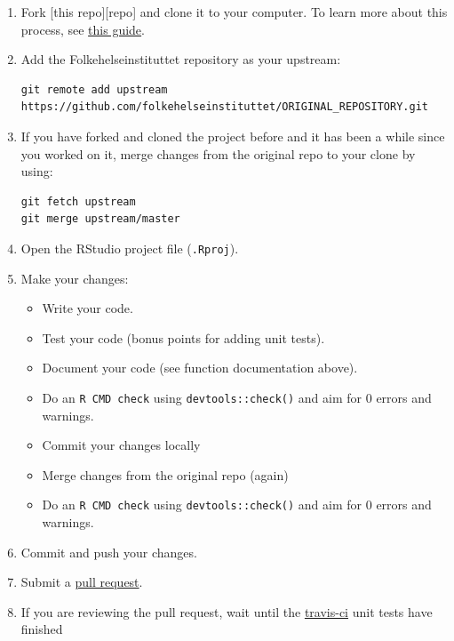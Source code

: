 \documentclass[12pt,]{article}
\providecommand{\tightlist}{%
  \setlength{\itemsep}{0pt}\setlength{\parskip}{0pt}}
\theoremstyle{definition}
\theoremstyle{definition}
\theoremstyle{definition}
\theoremstyle{remark}
\begin{document}
\begin{enumerate}
\def\labelenumi{\arabic{enumi}.}
\item
  Fork {[}this repo{]}{[}repo{]} and clone it to your computer. To learn
  more about this process, see
  \href{https://guides.github.com/activities/forking/}{this guide}.
\item
  Add the Folkehelseinstituttet repository as your upstream:

\begin{verbatim}
git remote add upstream https://github.com/folkehelseinstituttet/ORIGINAL_REPOSITORY.git
\end{verbatim}
\item
  If you have forked and cloned the project before and it has been a
  while since you worked on it, merge changes from the original repo to
  your clone by using:

\begin{verbatim}
git fetch upstream
git merge upstream/master
\end{verbatim}
\item
  Open the RStudio project file (\texttt{.Rproj}).
\item
  Make your changes:

  \begin{itemize}
  \tightlist
  \item
    Write your code.
  \item
    Test your code (bonus points for adding unit tests).
  \item
    Document your code (see function documentation above).
  \item
    Do an \texttt{R\ CMD\ check} using \texttt{devtools::check()} and
    aim for 0 errors and warnings.
  \item
    Commit your changes locally
  \item
    Merge changes from the original repo (again)
  \item
    Do an \texttt{R\ CMD\ check} using \texttt{devtools::check()} and
    aim for 0 errors and warnings.
  \end{itemize}
\item
  Commit and push your changes.
\item
  Submit a
  \href{https://guides.github.com/activities/forking/\#making-a-pull-request}{pull
  request}.
\item
  If you are reviewing the pull request, wait until the
  \href{www.travis-ci.org}{travis-ci} unit tests have finished
\end{enumerate}
\end{document}
